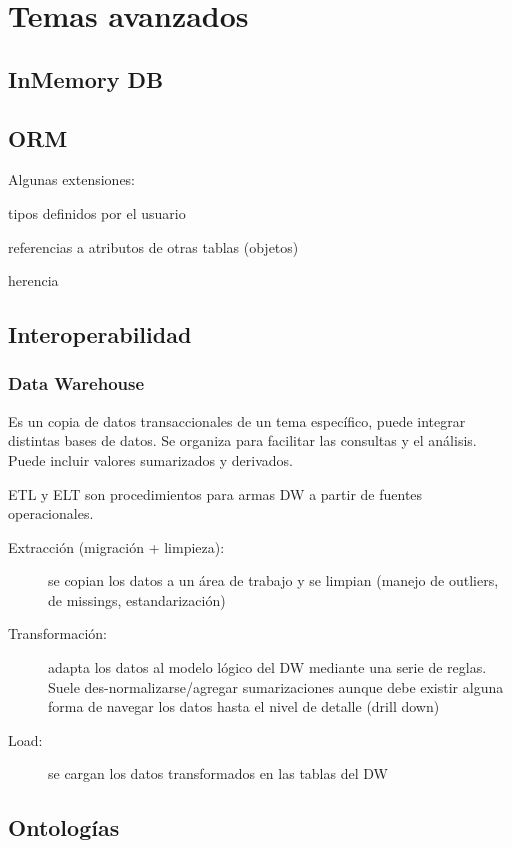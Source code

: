 \chapter{Temas avanzados}

\section{InMemory DB}

\section{ORM}

Algunas extensiones:

tipos definidos por el usuario

referencias a atributos de otras tablas (objetos)

herencia

\section{Interoperabilidad}

\subsection{Data Warehouse}

Es un copia de datos transaccionales de un tema específico, puede integrar distintas bases de datos. Se organiza para facilitar las consultas y el análisis. Puede incluir valores sumarizados y derivados.

ETL y ELT son procedimientos para armas DW a partir de fuentes operacionales.

\begin{description}
	\item[Extracción (migración + limpieza):] se copian los datos a un área de trabajo y se limpian (manejo de outliers, de missings, estandarización)
	\item[Transformación:] adapta los datos al modelo lógico del DW mediante una serie de reglas. Suele des-normalizarse/agregar sumarizaciones aunque debe existir alguna forma de navegar los datos hasta el nivel de detalle (drill down)
	\item[Load:] se cargan los datos transformados en las tablas del DW
\end{description}

\section{Ontologías}

